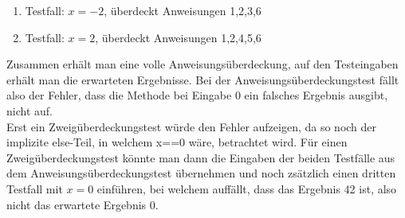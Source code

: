\begin{enumerate}
\item Testfall: $x=-2$, überdeckt Anweisungen 1,2,3,6
\item Testfall: $x=2$, überdeckt Anweisungen 1,2,4,5,6
\end{enumerate}
Zusammen erhält man eine volle Anweisungsüberdeckung, auf den Testeingaben
erhält man die erwarteten Ergebnisse. Bei der Anweisungsüberdeckungstest
fällt also der Fehler, dass die Methode bei Eingabe 0 ein falsches Ergebnis
ausgibt, nicht auf. \\
Erst ein Zweigüberdeckungstest würde den Fehler aufzeigen, da so noch der
implizite else-Teil, in welchem x==0 wäre, betrachtet wird. Für einen
Zweigüberdeckungstest könnte man dann die Eingaben der beiden Testfälle aus dem 
Anweisungsüberdeckungstest übernehmen und noch zsätzlich einen dritten Testfall
mit $x=0$ einführen, bei welchem auffällt, dass das Ergebnis 42 ist, also
nicht das erwartete Ergebnis 0.


